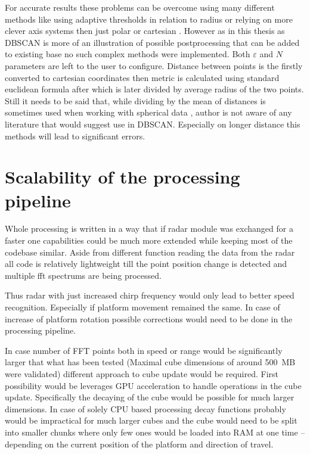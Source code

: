 For accurate results these problems can be overcome using many different methods like using adaptive thresholds in relation to radius \cite{Kellner2012} or relying on more clever axis systems then just polar or cartesian \cite{Sun2024}.
However as in this thesis as DBSCAN is more of an illustration of possible postprocessing that can be added to existing base no such complex methods were implemented.
Both $\varepsilon$ and $N$ parameters are left to the user to configure.
Distance between points is the firstly converted to cartesian coordinates then metric is calculated using standard euclidean formula after which is later divided by average radius of the two points.
Still it needs to be said that, while dividing by the mean of distances is sometimes used when working with spherical data \cite{Fisher1993}, author is not aware of any literature that would suggest use in DBSCAN.
Especially on longer distance this methods will lead to significant errors.




\section{Scalability of the processing pipeline}

Whole processing is written in a way that if radar module was exchanged for a faster one capabilities could be much more extended while keeping most of the codebase similar.
Aside from different function reading the data from the radar all code is relatively lightweight till the point position change is detected and multiple fft spectrums are being processed.

Thus radar with just increased chirp frequency would only lead to better speed recognition.
Especially if platform movement remained the same.
In case  of increase of platform rotation possible corrections would need to be done in the processing pipeline.

In case number of FFT points both in speed or range would be significantly larger that what has been tested (Maximal cube dimensions of around 500~MB were validated) different approach to cube update would be required.
First possibility would be leverages GPU acceleration to handle operations in the cube update.
Specifically the decaying of the cube would be possible for much larger dimensions.
In case of solely CPU based processing decay functions probably would be impractical for much larger cubes and the cube would need to be split into smaller chunks where only few ones would be loaded into RAM at one time -- depending on the current position of the platform and direction of travel.









\listoffigures

\listoftables



\clearpage
\openright

